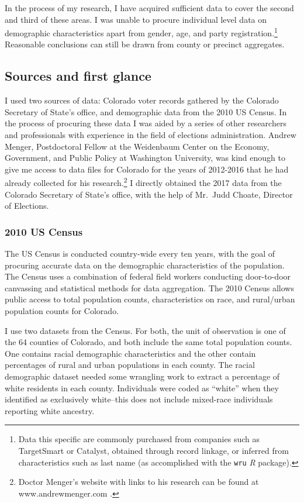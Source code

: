 \documentclass[12pt,twoside]{reedthesis}
\begin{document}
  In the process of my research, I have acquired sufficient data to cover
  the second and third of these areas. I was unable to procure individual
  level data on demographic characteristics apart from gender, age, and
  party registration.\footnote{Data this specific are commonly purchased
    from companies such as TargetSmart or Catalyst, obtained through
    record linkage, or inferred from characteristics such as last name (as
    accomplished with the \texttt{wru} \textit{R} package).} Reasonable
  conclusions can still be drawn from county or precinct aggregates.
  
  \subsection{Sources and first glance}\label{sources-and-first-glance}
  
  I used two sources of data: Colorado voter records gathered by the
  Colorado Secretary of State's office, and demographic data from the 2010
  US Census. In the process of procuring these data I was aided by a
  series of other researchers and professionals with experience in the
  field of elections administration. Andrew Menger, Postdoctoral Fellow at
  the Weidenbaum Center on the Economy, Government, and Public Policy at
  Washington University, was kind enough to give me access to data files
  for Colorado for the years of 2012-2016 that he had already collected
  for his research.\footnote{Doctor Menger's website with links to his
    research can be found at www.andrewmenger.com .} I directly obtained
  the 2017 data from the Colorado Secretary of State's office, with the
  help of Mr.~Judd Choate, Director of Elections.
  
  \subsubsection{2010 US Census}\label{us-census}
  
  The US Census is conducted country-wide every ten years, with the goal
  of procuring accurate data on the demographic characteristics of the
  population. The Census uses a combination of federal field workers
  conducting door-to-door canvassing and statistical methods for data
  aggregation. The 2010 Census allows public access to total population
  counts, characteristics on race, and rural/urban population counts for
  Colorado.
  
  I use two datasets from the Census. For both, the unit of observation is
  one of the 64 counties of Colorado, and both include the same total
  population counts. One contains racial demographic characteristics and
  the other contain percentages of rural and urban populations in each
  county. The racial demographic dataset needed some wrangling work to
  extract a percentage of white residents in each county. Individuals were
  coded as ``white'' when they identified as exclusively white--this does
  not include mixed-race individuals reporting white ancestry.
  
\end{document}
